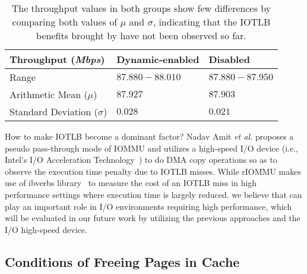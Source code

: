 \begin{table}[!ht]
\footnotesize
\begin{center}
\begin{tabular}{|l|l|l|}
\hline
{\textbf{Throughput (\emph{Mbps})}} & {\textbf{Dynamic-enabled}} & {\textbf{Disabled}}    \\ \hline
Range & $87.880-88.010$ & $87.880-87.950$ \\ \hline
Arithmetic Mean ($\mu$)  &  $87.927$ & $87.903$ \\ \hline
Standard Deviation ($\sigma$) &  $0.028$ & $0.021$ \\ \hline
\end{tabular}
\end{center}
\caption{The throughput values in both groups show few differences by comparing both values of $\mu$ and $\sigma$, indicating that the IOTLB benefits brought by \name have not been observed so far.}
\label{tab:netperf}
\end{table}

How to make IOTLB become a dominant factor? Nadav Amit \emph{et al.} proposes a pseudo pass-through mode of IOMMU and utilizes a high-speed I/O device (i.e., Intel’s I/O Acceleration Technology~\cite{lauritzenintel}) to do DMA copy operations so as to observe the execution time penalty due to IOTLB misses. While rIOMMU makes use of ibverbs library~\cite{ibverbsevaluation,kerr2011dissecting} to measure the cost of an IOTLB miss in high performance settings where execution time is largely reduced.
we believe that \name can play an important role in I/O environments requiring high performance, which will be evaluated in our future work by utilizing the previous approaches and the I/O high-speed device.

\subsection{Conditions of Freeing Pages in Cache}

